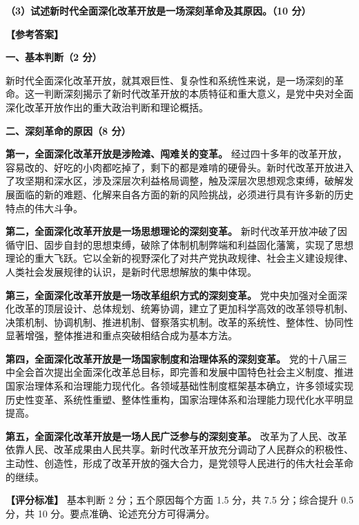 \documentclass[12pt, a4paper]{article}
\begin{document}
\begin{answerbox}
\textbf{（3）试述新时代全面深化改革开放是一场深刻革命及其原因。（10 分）}

\textbf{【参考答案】}

\textbf{一、基本判断（2 分）}

新时代全面深化改革开放，就其艰巨性、复杂性和系统性来说，是一场深刻的革命。这一判断深刻揭示了新时代改革开放的本质特征和重大意义，是党中央对全面深化改革开放作出的重大政治判断和理论概括。

\textbf{二、深刻革命的原因（8 分）}

\textbf{第一，全面深化改革开放是涉险滩、闯难关的变革。} 经过四十多年的改革开放，容易改的、好吃的小肉都吃掉了，剩下的都是难啃的硬骨头。新时代改革开放进入了攻坚期和深水区，涉及深层次利益格局调整，触及深层次思想观念束缚，破解发展面临的新的难题、化解来自各方面的新的风险挑战，必须进行具有许多新的历史特点的伟大斗争。

\textbf{第二，全面深化改革开放是一场思想理论的深刻变革。} 新时代改革开放冲破了因循守旧、固步自封的思想束缚，破除了体制机制弊端和利益固化藩篱，实现了思想理论的重大飞跃。它以全新的视野深化了对共产党执政规律、社会主义建设规律、人类社会发展规律的认识，是新时代思想解放的集中体现。

\textbf{第三，全面深化改革开放是一场改革组织方式的深刻变革。} 党中央加强对全面深化改革的顶层设计、总体规划、统筹协调，建立了更加科学高效的改革领导机制、决策机制、协调机制、推进机制、督察落实机制。改革的系统性、整体性、协同性显著增强，整体推进和重点突破相结合成为基本方法。

\textbf{第四，全面深化改革开放是一场国家制度和治理体系的深刻变革。} 党的十八届三中全会首次提出全面深化改革总目标，即完善和发展中国特色社会主义制度、推进国家治理体系和治理能力现代化。各领域基础性制度框架基本确立，许多领域实现历史性变革、系统性重塑、整体性重构，国家治理体系和治理能力现代化水平明显提高。

\textbf{第五，全面深化改革开放是一场人民广泛参与的深刻变革。} 改革为了人民、改革依靠人民、改革成果由人民共享。新时代改革开放充分调动了人民群众的积极性、主动性、创造性，形成了改革开放的强大合力，是党领导人民进行的伟大社会革命的继续。

\textbf{【评分标准】} 基本判断 2 分；五个原因每个方面 1.5 分，共 7.5 分；综合提升 0.5 分，共 10 分。要点准确、论述充分方可得满分。
\end{answerbox}
\end{document}
